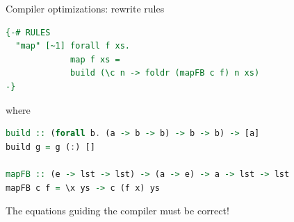 \documentclass[lualatex]{beamer}
\renewcommand{\_}{\textscale{.6}{\textunderscore}}
\begin{document}






\begin{frame}[fragile]{Compiler optimizations: rewrite rules}
\begin{lstlisting}[language=Haskell, morekeywords={foldr}]
{-# RULES
  "map" [~1] forall f xs.
             map f xs =
             build (\c n -> foldr (mapFB c f) n xs)
-}
\end{lstlisting}

where
\begin{lstlisting}[language=Haskell, morekeywords={foldr}]
build :: (forall b. (a -> b -> b) -> b -> b) -> [a]
build g = g (:) []

mapFB :: (e -> lst -> lst) -> (a -> e) -> a -> lst -> lst
mapFB c f = \x ys -> c (f x) ys
\end{lstlisting}

The equations guiding the compiler must be correct!
\end{frame}
\end{document}
